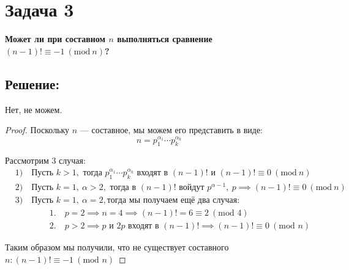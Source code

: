 \documentclass[12pt,a4paper]{article}
\newcommand{\zadacha}[2]{\section*{Задача #1} \textcolor{myblue}{\textbf{#2}}}
\begin{document}
\zadacha{3}{Может ли при составном \(n\) выполняться сравнение \((n-1)! \equiv -1 \ (\text{mod} \ n)\)?}

\subsection*{Решение:}

Нет, не можем.

\begin{proof} 

Поскольку $n$ — составное, мы можем его представить в виде: 
\[
n=p_1^{\alpha_1} \cdots p_k^{\alpha_k}
\]

Рассмотрим 3 случая:
\begin{align*}
	&1)\quad \text{Пусть } k > 1, \text{ тогда } p_1^{\alpha_1} \cdots p_k^{\alpha_k} \text{ входят в } (n-1)! \text{ и } (n-1)!\equiv0\ (\mathrm{mod}\ n) \\
	&2)\quad \text{Пусть } k = 1,\ \alpha > 2, \text{ тогда в } (n-1)! \text{ войдут } p^{\alpha - 1},\ p \implies (n-1)! \equiv 0\ (\text{mod}\ n) \\
	&3)\quad \text{Пусть } k= 1,\ \alpha=2, \text{тогда мы получаем ещё два случая}: \\
	&\qquad\qquad 1.\quad p =2\implies n =4 \implies (n-1)! = 6 \equiv 2\ (\text{mod } 4)\\ 
	&\qquad\qquad 2.\quad p > 2 \implies p \text{ и } 2p \text{ входят в } (n-1)! \implies (n-1)! \equiv 0\ (\text{mod }n)
\end{align*}

Таким образом мы получили, что не существует составного $n: (n-1)!\equiv -1\ (\text{mod } n)$

\end{proof}
\end{document}
